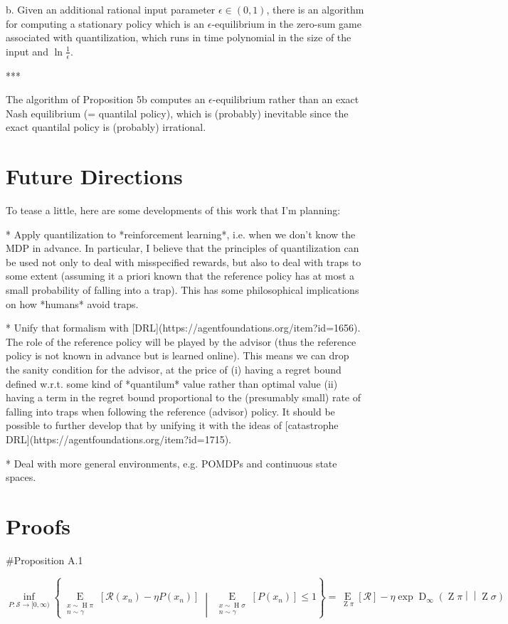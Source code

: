 \documentclass[a4paper]{article}
\newcommand{\AP}[1]{\left(#1\right)}
\newcommand{\AB}[1]{\left[#1\right]}
\newcommand{\ACM}[2]{\left\{#1\;\middle\vert\;#2\right\}}
\newcommand{\Ea}[2]{\underset{#1}{\operatorname{E}}\AB{#2}}
\newcommand{\RD}[3]{\operatorname{D}_{#1}\AP{#2\middle\vert\middle\vert#3}}
\newcommand{\St}{\mathcal{S}}
\newcommand{\R}{\mathcal{R}}
\newcommand{\Pe}{P}
\DeclareMathOperator{\Hi}{H}
\DeclareMathOperator{\Z}{Z}
\begin{document}
b. Given an additional rational input parameter $\epsilon\in(0,1)$, there is an algorithm for computing a stationary policy which is an $\epsilon$-equilibrium in the zero-sum game associated with quantilization, which runs in time polynomial in the size of the input and $\ln\frac{1}{\epsilon}$.

***

The algorithm of Proposition 5b computes an $\epsilon$-equilibrium rather than an exact Nash equilibrium (= quantilal policy), which is (probably) inevitable since the exact quantilal policy is (probably) irrational.

\section{Future Directions}

To tease a little, here are some developments of this work that I'm planning:

* Apply quantilization to *reinforcement learning*, i.e. when we don't know the MDP in advance. In particular, I believe that the principles of quantilization can be used not only to deal with misspecified rewards, but also to deal with traps to some extent (assuming it a priori known that the reference policy has at most a small probability of falling into a trap). This has some philosophical implications on how *humans* avoid traps.

* Unify that formalism with [DRL](https://agentfoundations.org/item?id=1656). The role of the reference policy will be played by the advisor (thus the reference policy is not known in advance but is learned online). This means we can drop the sanity condition for the advisor, at the price of (i) having a regret bound defined w.r.t. some kind of *quantilum* value rather than optimal value (ii) having a term in the regret bound proportional to the (presumably small) rate of falling into traps when following the reference (advisor) policy. It should be possible to further develop that by unifying it with the ideas of [catastrophe DRL](https://agentfoundations.org/item?id=1715).

* Deal with more general environments, e.g. POMDPs and continuous state spaces.

\section{Proofs}

\#Proposition A.1

$$\inf_{\Pe:\St\rightarrow[0,\infty)}\ACM{\Ea{\substack{x\sim\Hi{\pi}\\n\sim\gamma}}{\R\AP{x_n}-\eta\Pe\AP{x_n}}}{\Ea{\substack{x\sim\Hi{\sigma}\\n\sim\gamma}}{\Pe\AP{x_n}}\leq1}=\Ea{\Z{\pi}}{\R}-\eta \exp{\RD{\infty}{\Z{\pi}}{\Z{\sigma}}}$$
\end{document}

